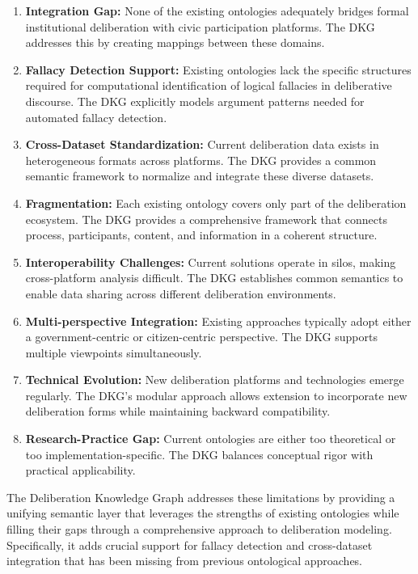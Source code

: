 \documentclass[11pt,a4paper]{article}
\begin{document}
\begin{enumerate}
    \item \textbf{Integration Gap:} None of the existing ontologies adequately bridges formal institutional deliberation with civic participation platforms. The DKG addresses this by creating mappings between these domains.
    
    \item \textbf{Fallacy Detection Support:} Existing ontologies lack the specific structures required for computational identification of logical fallacies in deliberative discourse. The DKG explicitly models argument patterns needed for automated fallacy detection.
    
    \item \textbf{Cross-Dataset Standardization:} Current deliberation data exists in heterogeneous formats across platforms. The DKG provides a common semantic framework to normalize and integrate these diverse datasets.
    
    \item \textbf{Fragmentation:} Each existing ontology covers only part of the deliberation ecosystem. The DKG provides a comprehensive framework that connects process, participants, content, and information in a coherent structure.
    
    \item \textbf{Interoperability Challenges:} Current solutions operate in silos, making cross-platform analysis difficult. The DKG establishes common semantics to enable data sharing across different deliberation environments.
    
    \item \textbf{Multi-perspective Integration:} Existing approaches typically adopt either a government-centric or citizen-centric perspective. The DKG supports multiple viewpoints simultaneously.
    
    \item \textbf{Technical Evolution:} New deliberation platforms and technologies emerge regularly. The DKG's modular approach allows extension to incorporate new deliberation forms while maintaining backward compatibility.
    
    \item \textbf{Research-Practice Gap:} Current ontologies are either too theoretical or too implementation-specific. The DKG balances conceptual rigor with practical applicability.
\end{enumerate}

The Deliberation Knowledge Graph addresses these limitations by providing a unifying semantic layer that leverages the strengths of existing ontologies while filling their gaps through a comprehensive approach to deliberation modeling. Specifically, it adds crucial support for fallacy detection and cross-dataset integration that has been missing from previous ontological approaches.
\end{document}
